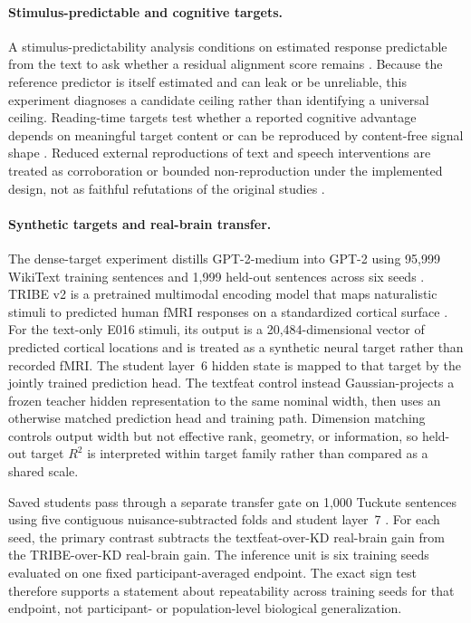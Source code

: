\paragraph{Stimulus-predictable and cognitive targets.}
A stimulus-predictability analysis conditions on estimated response predictable from the text to ask whether a residual alignment score remains .
Because the reference predictor is itself estimated and can leak or be unreliable, this experiment diagnoses a candidate ceiling rather than identifying a universal ceiling.
Reading-time targets test whether a reported cognitive advantage depends on meaningful target content or can be reproduced by content-free signal shape .
Reduced external reproductions of text and speech interventions are treated as corroboration or bounded non-reproduction under the implemented design, not as faithful refutations of the original studies .

\paragraph{Synthetic targets and real-brain transfer.}
The dense-target experiment distills GPT-2-medium into GPT-2 using 95,999 WikiText training sentences and 1,999 held-out sentences across six seeds .
TRIBE v2 is a pretrained multimodal encoding model that maps naturalistic stimuli to predicted human fMRI responses on a standardized cortical surface \autocite{dascoli2026}.
For the text-only E016 stimuli, its output is a 20,484-dimensional vector of predicted cortical locations and is treated as a synthetic neural target rather than recorded fMRI.
The student layer~6 hidden state is mapped to that target by the jointly trained prediction head.
The textfeat control instead Gaussian-projects a frozen teacher hidden representation to the same nominal width, then uses an otherwise matched prediction head and training path.
Dimension matching controls output width but not effective rank, geometry, or information, so held-out target $R^2$ is interpreted within target family rather than compared as a shared scale.

Saved students pass through a separate transfer gate on 1,000 Tuckute sentences using five contiguous nuisance-subtracted folds and student layer~7 .
For each seed, the primary contrast subtracts the textfeat-over-KD real-brain gain from the TRIBE-over-KD real-brain gain.
The inference unit is six training seeds evaluated on one fixed participant-averaged endpoint.
The exact sign test therefore supports a statement about repeatability across training seeds for that endpoint, not participant- or population-level biological generalization.

